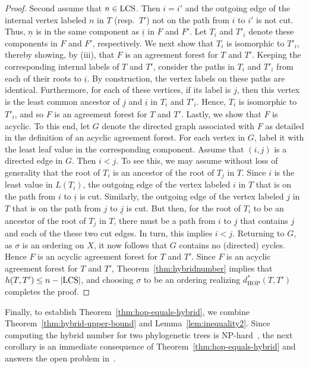 \documentclass{article}
\newcommand{\HOP}{\mathrm{HOP}}
\begin{document}
\begin{proof}
Second assume that $n\in {\rm LCS}$. Then $i=i'$ and the outgoing edge of the internal vertex labeled $n$ in $T$ (resp.\ $T'$) not on the path from $i$ to $i'$ is not cut. Thus, $\underline n$ is in the same component as $\underline{i}$ in $F$ and $F'$. Let $T_i$ and $T'_i$ denote these components in $F$ and $F'$, respectively. We next show that $T_i$ is isomorphic to $T'_i$, thereby showing, by (iii), that $F$ is an agreement forest for $T$ and $T'$. Keeping the corresponding internal labels of $T$ and $T'$, consider the paths in $T_i$ and $T'_i$ from each of their roots to $\underline{i}$. By construction, the vertex labels on these paths are identical. Furthermore, for each of these vertices, if its label is $j$, then this vertex is the least common ancestor of $\underline j$ and $\underline{i}$ in $T_i$ and $T'_i$. Hence, $T_i$ is isomorphic to $T'_i$, and so $F$ is an agreement forest for $T$ and $T'$. Lastly, we show that $F$ is  acyclic. To this end, let $G$ denote the directed graph associated with $F$ as detailed in the definition of an acyclic agreement forest. For each vertex in $G$, label it with the least leaf value in the corresponding component. Assume that $(i, j)$ is a directed edge in $G$.
Then $i < j$. To see this, we may assume without loss of generality that the root of $T_i$ is an ancestor of the root of $T_j$ in $T$. Since $i$ is the least value in $L(T_i)$, the outgoing edge of the vertex labeled $i$ in $T$ that is on the path from $i$ to $\underline{i}$ is cut. Similarly, the outgoing edge of the vertex labeled $j$ in $T$ that is on the path from $j$ to $\underline{j}$ is cut. But then, for the root of $T_i$ to be an ancestor of the root of $T_j$ in $T$, there must be a path from $i$ to $\underline{j}$ that contains $j$ and each of the these two cut edges. In turn, this implies $i < j$. Returning to $G$, as $\sigma$ is an ordering on $X$, it now follows that $G$ contains no (directed) cycles. Hence $F$ is an acyclic agreement forest for $T$ and $T'$. 
Since $F$ is an acyclic agreement forest for $T$ and $T'$, Theorem~\ref{thm:hybridnumber} implies that $h(T,T') \leq n - |{\rm LCS}|$, and choosing $\sigma$ to be an ordering realizing $d^\ast_{\HOP}(T,T')$ completes the proof.
\end{proof}

Finally, to establish Theorem~\ref{thm:hop-equals-hybrid}, we  combine Theorem~\ref{thm:hybrid-upper-bound} and Lemma~\ref{lem:inequality2}. 
Since computing the hybrid number for two phylogenetic trees is NP-hard~\cite{bordewich2007computing}, the next corollary is an immediate consequence of Theorem~\ref{thm:hop-equals-hybrid} and answers the open problem in~\cite[page 10, Remark 2]{hop}.
\end{document}

